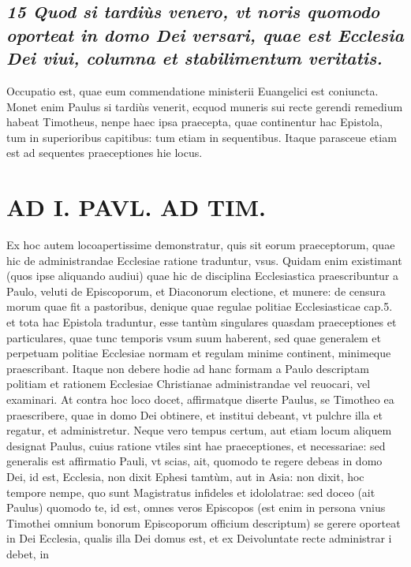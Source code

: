 \documentclass{article}
\begin{document}
\begin{pages}
\subsection*{\textit{15 Quod si tardiùs venero, vt noris quomodo oporteat in domo Dei versari, quae est Ecclesia Dei viui, columna et stabilimentum veritatis. }}\pstart Occupatio est, quae eum commendatione ministerii Euangelici est coniuncta. Monet enim Paulus si tardiùs venerit, ecquod muneris sui recte gerendi remedium habeat Timotheus, nenpe haec ipsa praecepta, quae continentur hac Epistola, tum in superioribus capitibus: tum etiam in sequentibus. Itaque parasceue etiam est ad sequentes praeceptiones hie locus.  \pend
\section*{AD I. PAVL. AD TIM. }
\marginpar{[ p.168 ]}\pstart Ex hoc autem locoapertissime demonstratur, quis sit eorum praeceptorum, quae hic de administrandae Ecclesiae ratione traduntur, vsus. Quidam enim existimant (quos ipse aliquando audiui) quae hic de disciplina Ecclesiastica praescribuntur a Paulo, veluti de Episcoporum, et Diaconorum electione, et munere: de censura morum quae fit a pastoribus, denique quae regulae politiae Ecclesiasticae cap.5. et tota hac Epistola traduntur, esse tantùm singulares quasdam praeceptiones et particulares, quae tunc temporis vsum suum haberent, sed quae generalem et perpetuam politiae Ecclesiae normam et regulam minime continent, minimeque praescribant. Itaque non debere hodie ad hanc formam a Paulo descriptam politiam et rationem Ecclesiae Christianae administrandae vel reuocari, vel examinari. At contra hoc loco docet, affirmatque diserte Paulus, se Timotheo ea praescribere, quae in domo Dei obtinere, et institui debeant, vt pulchre illa et regatur, et administretur. Neque vero tempus certum, aut etiam locum aliquem designat Paulus, cuius ratione vtiles sint hae praeceptiones, et necessariae: sed generalis est affirmatio Pauli, vt scias, ait, quomodo te regere debeas in domo Dei, id est, Ecclesia, non dixit Ephesi tamtùm, aut in Asia: non dixit, hoc tempore nempe, quo sunt Magistratus infideles et idololatrae: sed doceo (ait Paulus) quomodo te, id est, omnes veros Episcopos (est enim in persona vnius Timothei omnium bonorum Episcoporum officium descriptum) se gerere oporteat in Dei Ecclesia, qualis illa Dei domus est, et ex Deivoluntate recte administrar i debet, in  \pend

\end{pages}
\end{document}
